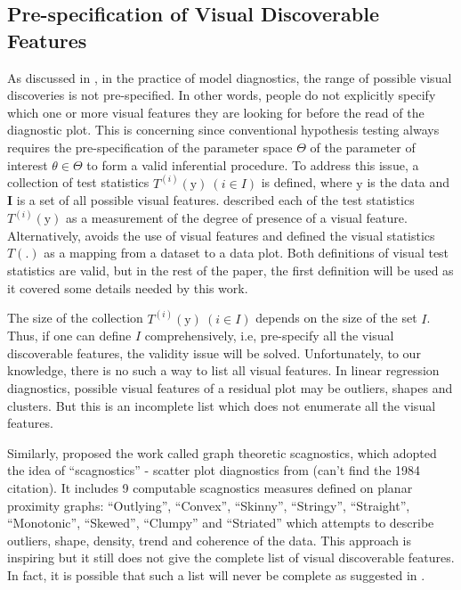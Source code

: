 \documentclass{monashthesis}
\begin{document}
\hypertarget{pre-specification-of-visual-discoverable-features}{%
\subsection{Pre-specification of Visual Discoverable Features}\label{pre-specification-of-visual-discoverable-features}}

As discussed in \textcite{buja_statistical_2009}, in the practice of model diagnostics, the range of possible visual discoveries is not pre-specified. In other words, people do not explicitly specify which one or more visual features they are looking for before the read of the diagnostic plot. This is concerning since conventional hypothesis testing always requires the pre-specification of the parameter space \(\Theta\) of the parameter of interest \(\theta \in \Theta\) to form a valid inferential procedure. To address this issue, a collection of test statistics \(T^{(i)}(\boldsymbol{\mathrm{y}})~(i \in I)\) is defined, where \(\boldsymbol{\mathrm{y}}\) is the data and \(\boldsymbol{I}\) is a set of all possible visual features. \textcite{buja_statistical_2009} described each of the test statistics \(T^{(i)}(\boldsymbol{\mathrm{y}})\) as a measurement of the degree of presence of a visual feature. Alternatively, \textcite{majumder_validation_2013} avoids the use of visual features and defined the visual statistics \(T(.)\) as a mapping from a dataset to a data plot. Both definitions of visual test statistics are valid, but in the rest of the paper, the first definition will be used as it covered some details needed by this work.

The size of the collection \(T^{(i)}(\boldsymbol{\mathrm{y}})~(i \in I)\) depends on the size of the set \(I\). Thus, if one can define \(I\) comprehensively, i.e, pre-specify all the visual discoverable features, the validity issue will be solved. Unfortunately, to our knowledge, there is no such a way to list all visual features. In linear regression diagnostics, possible visual features of a residual plot may be outliers, shapes and clusters. But this is an incomplete list which does not enumerate all the visual features.

Similarly, \textcite{wilkinson_graph-theoretic_2005} proposed the work called graph theoretic scagnostics, which adopted the idea of ``scagnostics'' - scatter plot diagnostics from (can't find the 1984 citation). It includes 9 computable scagnostics measures defined on planar proximity graphs: ``Outlying'', ``Convex'', ``Skinny'', ``Stringy'', ``Straight'', ``Monotonic'', ``Skewed'', ``Clumpy'' and ``Striated'' which attempts to describe outliers, shape, density, trend and coherence of the data. This approach is inspiring but it still does not give the complete list of visual discoverable features. In fact, it is possible that such a list will never be complete as suggested in \textcite{buja_statistical_2009}.
\end{document}
